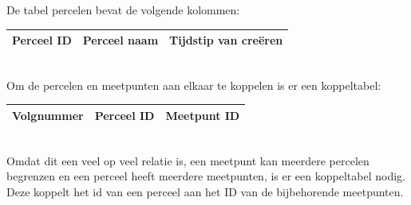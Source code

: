 De tabel percelen bevat de volgende kolommen:\\
\begin{tabularx}{\textwidth}{| X | X | X |}
    \hline
    \textbf{Perceel ID} & \textbf{Perceel naam} & \textbf{Tijdstip van creëren} \\ \hline
\end{tabularx}\\

Om de percelen en meetpunten aan elkaar te koppelen is er een koppeltabel:\\
\begin{tabularx}{\textwidth}{| X | X | X |}
    \hline
    \textbf{Volgnummer} & \textbf{Perceel ID} & \textbf{Meetpunt ID} \\ \hline
\end{tabularx}\\

Omdat dit een veel op veel relatie is, een meetpunt kan meerdere percelen begrenzen en
een perceel heeft meerdere meetpunten, is er een koppeltabel nodig. Deze koppelt het id
van een perceel aan het ID van de bijbehorende meetpunten.
